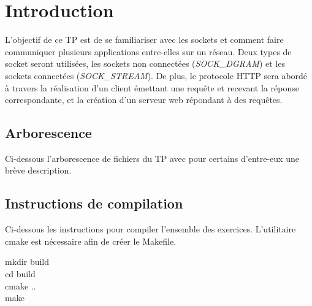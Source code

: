 \section{Introduction}
L'objectif de ce TP est de se familiariser avec les sockets et comment faire communiquer plusieurs applications entre-elles sur un réseau. Deux types de socket seront utilisées, les sockets non connectées (\emph{SOCK\_DGRAM}) et les sockets connectées (\emph{SOCK\_STREAM}). De plus, le protocole HTTP sera abordé à travers la réalisation d'un client émettant une requête et recevant la réponse correspondante, et la création d'un serveur web répondant à des requêtes.

\subsection{Arborescence}
\noindent Ci-dessous l'arborescence de fichiers du TP avec pour certains d'entre-eux une brève description.


\subsection{Instructions de compilation}
Ci-dessous les instructions pour compiler l'ensemble des exercices. L'utilitaire cmake \cite{cite:cmake} est nécessaire afin de créer le Makefile.

\begin{mdframed}[backgroundcolor=lightblue, linecolor=darkblue]
	mkdir build\\
	cd build\\
	cmake ..\\
	make
\end{mdframed}
